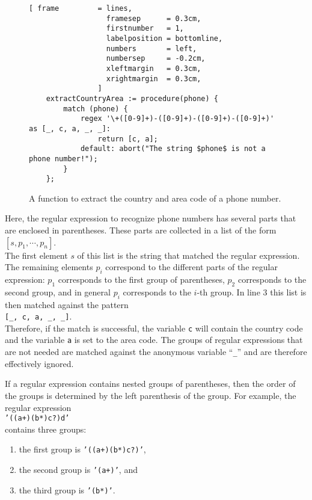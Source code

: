 \begin{figure}[!ht]
\centering
\begin{Verbatim}[ frame         = lines, 
                  framesep      = 0.3cm, 
                  firstnumber   = 1,
                  labelposition = bottomline,
                  numbers       = left,
                  numbersep     = -0.2cm,
                  xleftmargin   = 0.3cm,
                  xrightmargin  = 0.3cm,
                ]
    extractCountryArea := procedure(phone) {
        match (phone) {
            regex '\+([0-9]+)-([0-9]+)-([0-9]+)-([0-9]+)' as [_, c, a, _, _]:
                return [c, a];
            default: abort("The string $phone$ is not a phone number!");
        }
    };
\end{Verbatim}
\vspace*{-0.3cm}
\caption{A function to extract the country and area code of a phone number.}
\label{fig:extract-phone-code.stlx}
\end{figure}

\noindent
Here, the regular expression to recognize phone numbers has several parts that are
enclosed in parentheses.  These parts are collected in a list of the form
\\[0.2cm]
\hspace*{1.3cm}
$[s, p_1, \cdots, p_n]$.
\\[0.2cm]
The first element $s$ of this list is the string that matched the regular expression.  The
remaining elements $p_i$ correspond to the different parts of the regular expression: $p_1$
corresponds to the first group of parentheses, $p_2$ corresponds to the second group, and
in general $p_i$ corresponds to the $i$-th group.  In line 3 this list is then matched
against the pattern
\\[0.2cm]
\hspace*{1.3cm}
\texttt{[\_, c, a, \_, \_]}.
\\[0.2cm]
Therefore, if the match is successful, the variable \texttt{c} will contain the country
code and the variable \texttt{a} is set to the area code.  The groups of
regular expressions that are not needed are matched against the anonymous variable
``\texttt{\_}'' and are therefore effectively ignored.

If a regular expression contains  nested groups of parentheses, then the order of
the groups is determined by the left parenthesis of the group.  For example, the regular
expression 
\\[0.2cm]
\hspace*{1.3cm}
\texttt{'((a+)(b*)c?)d'}
\\[0.2cm]
contains three groups:
\begin{enumerate}
\item the first group is \texttt{'((a+)(b*)c?)'},
\item the second group is \texttt{'(a+)'}, and
\item the third group is \texttt{'(b*)'}.
\end{enumerate}

